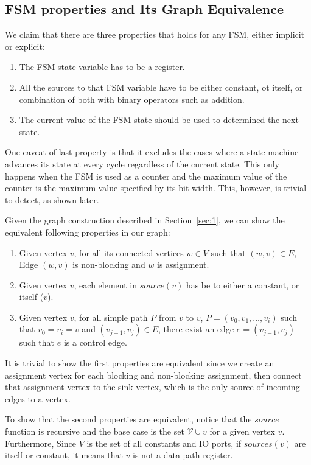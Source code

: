 \documentclass{article}
\begin{document}
\subsection{FSM properties and Its Graph Equivalence}
We claim that there are three properties that holds for any FSM, either implicit
or explicit:
\begin{enumerate}
    \item The FSM state variable has to be a register.
    \item\label{item:1} All the sources to that FSM variable have to be either constant, ot itself,
    or combination of both with binary operators such as addition.
    \item The current value of the FSM state should be used to determined the next
    state.
\end{enumerate}

One caveat of last property is that it excludes the cases where a state machine
advances its state at every cycle regardless of the current state. This only happens
when the FSM is used as a counter and the maximum value of the counter is the maximum
value specified by its bit width. This, however, is trivial to detect, as shown
later.

Given the graph construction described in Section~\ref{sec:1}, we can show the
equivalent following properties in our graph:
\begin{enumerate}
    \item Given vertex $v$, for all its connected vertices $w \in V$ such that
    $(w, v) \in E$, Edge $(w, v)$ is non-blocking and $w$ is assignment.
    \item Given vertex $v$, each element in $source(v)$ has be to either a constant,
    or itself ($v$).
    \item Given vertex $v$, for all simple path $P$ from $v$ to $v$,
    $P = (v_0, v_1, \dots, v_i)$ such that $v_0 = v_i = v$ and $(v_{j-1}, v_{j}) \in E$,
    there exist an edge $e = (v_{j-1}, v_j)$ such that $e$ is a control edge.
\end{enumerate}

It is trivial to show the first properties are equivalent since we create an assignment
vertex for each blocking and non-blocking assignment, then connect that assignment vertex
to the sink vertex, which is the only source of incoming edges to a vertex.

To show that the second properties are equivalent, notice that the $source$ function
is recursive and the base case is the set $\mathcal{V} \cup v$ for a given vertex
$v$. Furthermore, Since $V$ is the set of all constants and IO ports, if $sources(v)$ are itself
or constant, it means that $v$ is not a data-path register.
\end{document}
